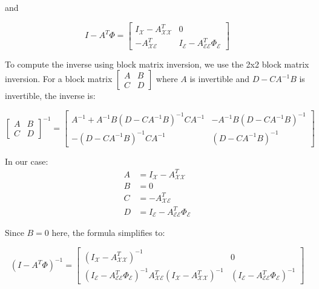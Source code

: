 \documentclass{article}
\begin{document}
\noindent and

\begin{equation*}
    I - A^T \Phi = \begin{bmatrix}
        I_{\mathcal{X}} - A_{\mathcal{XX}}^T & 0 \\
        -A_{\mathcal{XE}}^T & I_{\mathcal{E}} - A_{\mathcal{EE}}^T \Phi_{\mathcal{E}}
    \end{bmatrix}
\end{equation*}

\noindent To compute the inverse using block matrix inversion, we use the 2x2 block matrix inversion. For a block matrix $\begin{bmatrix} A & B \\ C & D \end{bmatrix}$ where $A$ is invertible and $D - CA^{-1}B$ is invertible, the inverse is:

\begin{equation*}
    \begin{bmatrix} A & B \\ C & D \end{bmatrix}^{-1} = \begin{bmatrix}
        A^{-1} + A^{-1}B(D-CA^{-1}B)^{-1}CA^{-1} & -A^{-1}B(D-CA^{-1}B)^{-1} \\
        -(D-CA^{-1}B)^{-1}CA^{-1} & (D-CA^{-1}B)^{-1}
    \end{bmatrix}
\end{equation*}

In our case:
\begin{align*}
    A &= I_{\mathcal{X}} - A_{\mathcal{XX}}^T \\
    B &= 0 \\
    C &= -A_{\mathcal{XE}}^T \\
    D &= I_{\mathcal{E}} - A_{\mathcal{EE}}^T \Phi_{\mathcal{E}}
\end{align*}

\noindent Since $B = 0$ here, the formula simplifies to:

\begin{equation*}
    \left(I - A^T \Phi\right)^{-1} = \begin{bmatrix}
        \left(I_{\mathcal{X}} - A_{\mathcal{XX}}^T\right)^{-1} & 0 \\
        \left(I_{\mathcal{E}} - A_{\mathcal{EE}}^T \Phi_{\mathcal{E}}\right)^{-1} A_{\mathcal{XE}}^T \left(I_{\mathcal{X}} - A_{\mathcal{XX}}^T\right)^{-1} & \left(I_{\mathcal{E}} - A_{\mathcal{EE}}^T \Phi_{\mathcal{E}}\right)^{-1}
    \end{bmatrix}
\end{equation*}
\end{document}
